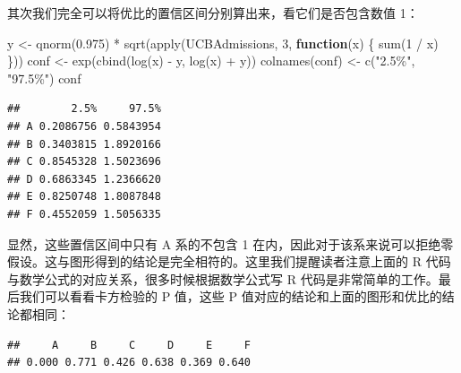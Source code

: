 \documentclass[
  b5paper,
  UTF8,twoside]{book}
\newenvironment{Shaded}{\begin{snugshade}}{\end{snugshade}}
\newcommand{\CommentTok}[1]{\textcolor[rgb]{0.56,0.35,0.01}{\textit{#1}}}
\newcommand{\ControlFlowTok}[1]{\textcolor[rgb]{0.13,0.29,0.53}{\textbf{#1}}}
\newcommand{\DecValTok}[1]{\textcolor[rgb]{0.00,0.00,0.81}{#1}}
\newcommand{\FloatTok}[1]{\textcolor[rgb]{0.00,0.00,0.81}{#1}}
\newcommand{\FunctionTok}[1]{\textcolor[rgb]{0.00,0.00,0.00}{#1}}
\newcommand{\NormalTok}[1]{#1}
\newcommand{\OtherTok}[1]{\textcolor[rgb]{0.56,0.35,0.01}{#1}}
\newcommand{\SpecialCharTok}[1]{\textcolor[rgb]{0.00,0.00,0.00}{#1}}
\newcommand{\StringTok}[1]{\textcolor[rgb]{0.31,0.60,0.02}{#1}}
\begin{document}
其次我们完全可以将优比的置信区间分别算出来，看它们是否包含数值 1：

\begin{Shaded}
\begin{Highlighting}[]
\NormalTok{y }\OtherTok{\textless{}{-}} \FunctionTok{qnorm}\NormalTok{(}\FloatTok{0.975}\NormalTok{) }\SpecialCharTok{*} \FunctionTok{sqrt}\NormalTok{(}\FunctionTok{apply}\NormalTok{(UCBAdmissions, }\DecValTok{3}\NormalTok{, }\ControlFlowTok{function}\NormalTok{(x) \{}
  \FunctionTok{sum}\NormalTok{(}\DecValTok{1} \SpecialCharTok{/}\NormalTok{ x)}
\NormalTok{\}))}
\NormalTok{conf }\OtherTok{\textless{}{-}} \FunctionTok{exp}\NormalTok{(}\FunctionTok{cbind}\NormalTok{(}\FunctionTok{log}\NormalTok{(x) }\SpecialCharTok{{-}}\NormalTok{ y, }\FunctionTok{log}\NormalTok{(x) }\SpecialCharTok{+}\NormalTok{ y))}
\FunctionTok{colnames}\NormalTok{(conf) }\OtherTok{\textless{}{-}} \FunctionTok{c}\NormalTok{(}\StringTok{"2.5\%"}\NormalTok{, }\StringTok{"97.5\%"}\NormalTok{)}
\NormalTok{conf}
\end{Highlighting}
\end{Shaded}

\begin{verbatim}
##        2.5%     97.5%
## A 0.2086756 0.5843954
## B 0.3403815 1.8920166
## C 0.8545328 1.5023696
## D 0.6863345 1.2366620
## E 0.8250748 1.8087848
## F 0.4552059 1.5056335
\end{verbatim}

显然，这些置信区间中只有 A 系的不包含 1 在内，因此对于该系来说可以拒绝零假设。这与图形得到的结论是完全相符的。这里我们提醒读者注意上面的 R 代码与数学公式的对应关系，很多时候根据数学公式写 R 代码是非常简单的工作。最后我们可以看看卡方检验的 P 值，这些 P 值对应的结论和上面的图形和优比的结论都相同：

\begin{Shaded}
\end{Shaded}

\begin{verbatim}
##     A     B     C     D     E     F 
## 0.000 0.771 0.426 0.638 0.369 0.640
\end{verbatim}
\end{document}
